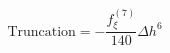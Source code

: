\begin{equation} 
\text{Truncation} = - \frac{f^{{(7)}}_{{\xi}}}{140} {\Delta h}^{6}
 \end{equation}